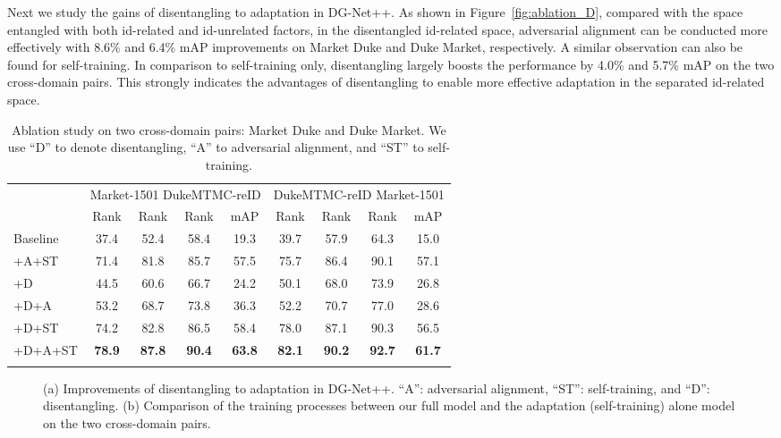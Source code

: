 \documentclass[runningheads]{llncs}
\begin{document}
Next we study the gains of disentangling to adaptation in DG-Net++. As shown in Figure~\ref{fig:ablation_D}, compared with the space entangled with both id-related and id-unrelated factors, in the disentangled id-related space, adversarial alignment can be conducted more effectively with 8.6\% and 6.4\% mAP improvements on Market  Duke and Duke  Market, respectively. A similar observation can also be found for self-training. In comparison to self-training only, disentangling largely boosts the performance by 4.0\% and 5.7\% mAP on the two cross-domain pairs. This strongly indicates the advantages of disentangling to enable more effective adaptation in the separated id-related space.


\begin{table}[t]
\centering
\begin{tabular*}{\linewidth}{l|cccc|cccc}
\shline \
\multirow{2}{*}{Methods} & \multicolumn{4}{c|}{Market-1501  DukeMTMC-reID} & \multicolumn{4}{c}{DukeMTMC-reID  Market-1501}\\
 & Rank & Rank & Rank & mAP & Rank & Rank & Rank & mAP \\ \hline
Baseline & 37.4 & 52.4 & 58.4 & 19.3 & 39.7 & 57.9 & 64.3 & 15.0 \\
+A+ST & 71.4 & 81.8 & 85.7 & 57.5 & 75.7 & 86.4 & 90.1 & 57.1 \\
+D & 44.5 & 60.6 & 66.7 & 24.2 & 50.1 & 68.0 & 73.9 & 26.8 \\
+D+A & 53.2 & 68.7 & 73.8 & 36.3 & 52.2 & 70.7 & 77.0 & 28.6 \\
+D+ST & 74.2 & 82.8 & 86.5 & 58.4 & 78.0 & 87.1 & 90.3 & 56.5 \\
+D+A+ST & \textbf{78.9} & \textbf{87.8} & \textbf{90.4} & \textbf{63.8} & \textbf{82.1} & \textbf{90.2} & \textbf{92.7} & \textbf{61.7}\\ 
\shline
\end{tabular*}
\vspace{1mm}
\caption{Ablation study on two cross-domain pairs: Market  Duke and Duke  Market. We use ``D'' to denote disentangling, ``A'' to adversarial alignment, and ``ST'' to self-training.}
\vspace{-10pt}
\label{tab:ablation}
\end{table}



\begin{figure}
\centering     {}
\subfigure[]{\label{fig:curve}\texttt{[image: figures/mAP\_curve.pdf]}}
\vspace{-.35cm}
\caption{(a) Improvements of disentangling to adaptation in DG-Net++. ``A'': adversarial alignment, ``ST'': self-training, and ``D'': disentangling. (b) Comparison of the training processes between our full model and the adaptation (self-training) alone model on the two cross-domain pairs.}
\end{figure}
\end{document}
